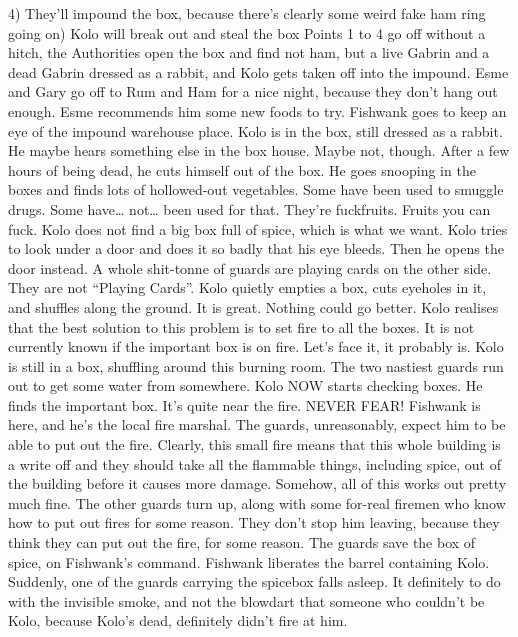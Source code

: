 4) They’ll impound the box, because there’s clearly some weird fake ham ring going on) Kolo will break out and steal the box\medskip
Points 1 to 4 go off without a hitch, the Authorities open the box and find not ham, but a live Gabrin and a dead Gabrin dressed as a rabbit, and Kolo gets taken off into the impound.\medskip
Esme and Gary go off to Rum and Ham for a nice night, because they don’t hang out enough. Esme recommends him some new foods to try.\medskip
Fishwank goes to keep an eye of the impound warehouse place.\medskip
Kolo is in the box, still dressed as a rabbit. He maybe hears something else in the box house. Maybe not, though.\medskip
After a few hours of being dead, he cuts himself out of the box.\medskip
He goes snooping in the boxes and finds lots of hollowed-out vegetables. Some have been used to smuggle drugs. Some have… not… been used for that.\medskip
They’re fuckfruits.\medskip
Fruits you can fuck.\medskip
Kolo does not find a big box full of spice, which is what we want.\medskip
Kolo tries to look under a door and does it so badly that his eye bleeds. Then he opens the door instead.\medskip
A whole shit-tonne of guards are playing cards on the other side. They are not “Playing Cards”.\medskip
Kolo quietly empties a box, cuts eyeholes in it, and shuffles along the ground. It is great. Nothing could go better.\medskip
Kolo realises that the best solution to this problem is to set fire to all the boxes.\medskip
It is not currently known if the important box is on fire.\medskip
Let’s face it, it probably is.\medskip
Kolo is still in a box, shuffling around this burning room.\medskip
The two nastiest guards run out to get some water from somewhere.\medskip
Kolo NOW starts checking boxes. He finds the important box. It’s quite near the fire.\medskip
NEVER FEAR! Fishwank is here, and he’s the local fire marshal. The guards, unreasonably, expect him to be able to put out the fire.\medskip
Clearly, this small fire means that this whole building is a write off and they should take all the flammable things, including spice, out of the building before it causes more damage.\medskip
Somehow, all of this works out pretty much fine.\medskip
The other guards turn up, along with some for-real firemen who know how to put out fires for some reason. They don’t stop him leaving, because they think they can put out the fire, for some reason.\medskip
The guards save the box of spice, on Fishwank’s command.\medskip
Fishwank liberates the barrel containing Kolo.\medskip
Suddenly, one of the guards carrying the spicebox falls asleep. It definitely to do with the invisible smoke, and not the blowdart that someone who couldn’t be Kolo, because Kolo’s dead, definitely didn’t fire at him.\medskip
